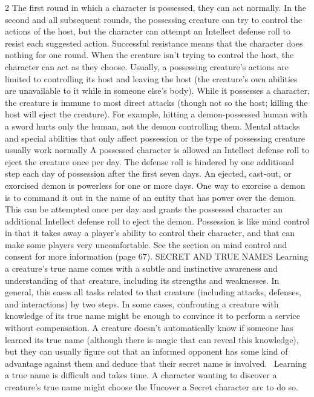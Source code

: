 \begin{multicols}{2}
	The first round in which a character is possessed, they can act normally. In the second and all subsequent rounds, the possessing creature can try to control the actions of the host, but the character can attempt an Intellect defense roll to resist each suggested action. Successful resistance means that the character does nothing for one round. When the creature isn’t trying to control the host, the character can act as they choose. Usually, a possessing creature’s actions are limited to controlling its host and leaving the host (the creature’s own abilities are unavailable to it while in someone else’s body).
	While it possesses a character, the creature is immune to most direct attacks (though not so the host; killing the host will eject the creature). For example, hitting a demon-possessed human with a sword hurts only the human, not the demon controlling them. Mental attacks and special abilities that only affect possession or the type of possessing creature usually work normally
	A possessed character is allowed an Intellect defense roll to eject the creature once per day. The defense roll is hindered by one additional step each day of possession after the first seven days. An ejected, cast-out, or exorcised demon is powerless for one or more days. One way to exorcise a demon is to command it out in the name of an entity that has power over the demon. This can be attempted once per day and grants the possessed character an additional Intellect defense roll to eject the demon.
	Possession is like mind control in that it takes away a player’s ability to control their character, and that can make some players very uncomfortable. See the section on mind control and consent for more information (page 67).
SECRET AND TRUE NAMES
Learning a creature’s true name comes with a subtle and instinctive awareness and understanding of that creature, including its strengths and weaknesses. In general, this eases all tasks related to that creature (including attacks, defenses, and interactions) by two steps. In some cases, confronting a creature with knowledge of its true name might be enough to convince it to perform a service without compensation. A creature doesn’t automatically know if someone has learned its true name (although there is magic that can reveal this knowledge), but they can usually figure out that an informed opponent has some kind of advantage against them and deduce that their secret name is involved. 
Learning a true name is difficult and takes time. A character wanting to discover a creature’s true name might choose the Uncover a Secret character arc to do so.

\end{multicols}
